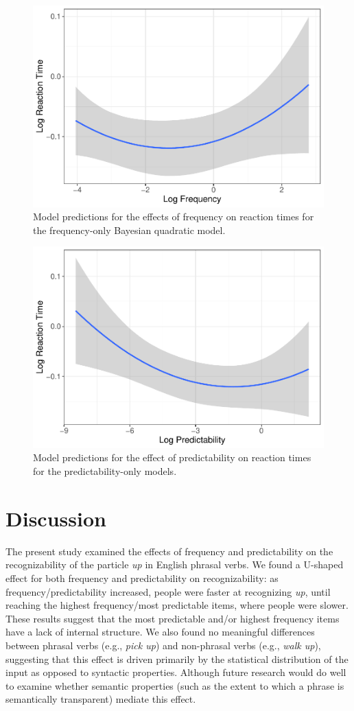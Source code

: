 \documentclass[
  man,floatsintext]{apa6}
\begin{document}
\begin{figure}

{\centering \includegraphics[width=0.6\linewidth]{write-up_files/figure-latex/FreqOnlyPlot-1} 

}

\caption{Model predictions for the effects of frequency on reaction times for the frequency-only Bayesian quadratic model.}\label{fig:FreqOnlyPlot}
\end{figure}

\begin{figure}

{\centering \includegraphics[width=0.6\linewidth]{write-up_files/figure-latex/PredicOnlyPlot-1} 

}

\caption{Model predictions for the effect of predictability on reaction times for the predictability-only models.}\label{fig:PredicOnlyPlot}
\end{figure}

\section{Discussion}\label{discussion}

The present study examined the effects of frequency and predictability on the recognizability of the particle \emph{up} in English phrasal verbs. We found a U-shaped effect for both frequency and predictability on recognizability: as frequency/predictability increased, people were faster at recognizing \emph{up}, until reaching the highest frequency/most predictable items, where people were slower. These results suggest that the most predictable and/or highest frequency items have a lack of internal structure. We also found no meaningful differences between phrasal verbs (e.g., \emph{pick up}) and non-phrasal verbs (e.g., \emph{walk up}), suggesting that this effect is driven primarily by the statistical distribution of the input as opposed to syntactic properties. Although future research would do well to examine whether semantic properties (such as the extent to which a phrase is semantically transparent) mediate this effect.
\end{document}
